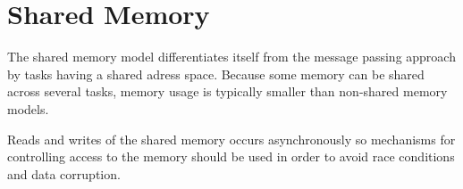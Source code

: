 \section{Shared Memory}

The shared memory model differentiates itself from the message passing approach by tasks having a shared adress space. Because some memory can be shared across several tasks, memory usage is typically smaller than non-shared memory models.

Reads and writes of the shared memory occurs asynchronously so mechanisms for controlling access to the memory should be used in order to avoid race conditions and data corruption.
